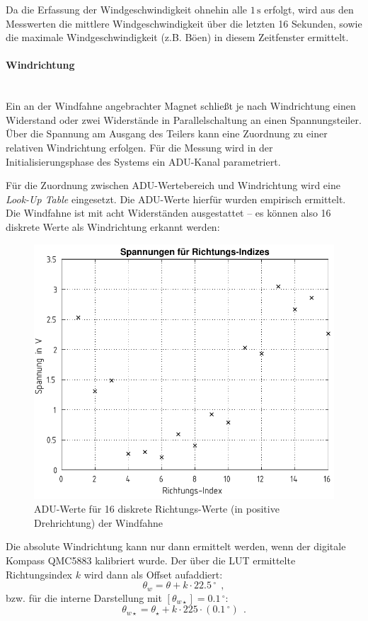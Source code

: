             Da die Erfassung der Windgeschwindigkeit ohnehin alle $1\,\mathrm{s}$ erfolgt, wird aus den Messwerten die mittlere Windgeschwindigkeit über die letzten 16 Sekunden, sowie die maximale Windgeschwindigkeit (z.B. Böen) in diesem Zeitfenster ermittelt.
            
            \paragraph{Windrichtung}\mbox{}\\
            Ein an der Windfahne angebrachter Magnet schließt je nach Windrichtung einen Widerstand oder zwei Widerstände in Parallelschaltung an einen Spannungsteiler. Über die Spannung am Ausgang des Teilers kann eine Zuordnung zu einer relativen Windrichtung erfolgen. Für die Messung wird in der Initialisierungsphase des Systems ein ADU-Kanal parametriert.
            
            Für die Zuordnung zwischen ADU-Wertebereich und Windrichtung wird eine \emph{Look-Up Table} eingesetzt. Die ADU-Werte hierfür wurden empirisch ermittelt. Die Windfahne ist mit acht Widerständen ausgestattet -- es können also 16 diskrete Werte als Windrichtung erkannt werden:
            \begin{figure}[H]
                \centering
                \includegraphics[width=.7\textwidth]{./img/Windfahne.pdf}
                \caption{ADU-Werte für 16 diskrete Richtungs-Werte (in positive Drehrichtung) der Windfahne}
                \label{fig:wv_adc}
            \end{figure}
        
            Die absolute Windrichtung kann nur dann ermittelt werden, wenn der digitale Kompass QMC5883 kalibriert wurde. Der über die LUT ermittelte Richtungsindex $k$ wird dann als Offset aufaddiert:
            \begin{equation*}
                \theta_w = \theta + k \cdot 22.5\,^\circ~~,
            \end{equation*}
            bzw. für die interne Darstellung mit $[\theta_{w\star}] = 0.1\,^\circ$:
            \begin{equation*}
                \theta_{w\star} = \theta_\star + k \cdot 225 \cdot (0.1\,^\circ)~~.
            \end{equation*}
        
